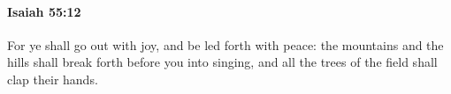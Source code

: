 
		\paragraph{Isaiah 55:12} %
			\label{ISAIAH-55-12}

			For ye shall go out with joy, and be led forth with peace: the mountains and the hills shall break forth before you into singing, and all the trees of the field shall clap their hands.


